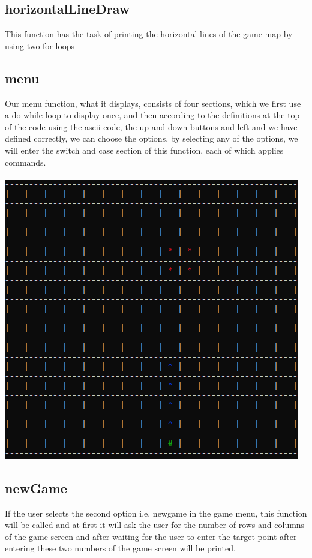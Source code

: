 \documentclass[12pt,a4paper]{article}
\begin{document}
	\subsection{horizontalLineDraw}
	This function has the task of printing the horizontal lines of the game map by using two for loops
	\subsection{menu}
	Our menu function, what it displays, consists of four sections, which we first use a do while loop to display once, and then according to the definitions at the top of the code using the ascii code, the up and down buttons and left
	and we have defined correctly, we can choose the options, by selecting any of the options, we will enter the switch and case section of this function, each of which applies commands.\\ \\
	\includegraphics[scale = 1]{Graphics/map.png}
	\subsection{newGame}
	If the user selects the second option i.e. newgame in the game menu, 
	this function will be called and at first it will ask the user for the number of rows and columns of the game screen and after waiting for the user to enter the target point after entering these two numbers of the game screen will be printed.
\end{document}
